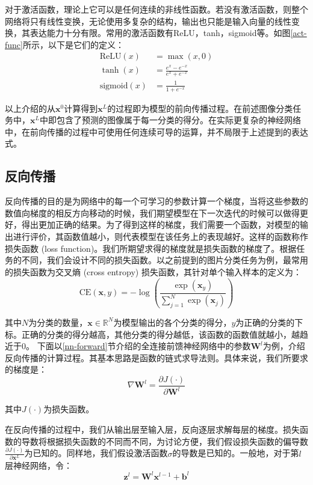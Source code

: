 对于激活函数，理论上它可以是任何连续的非线性函数。若没有激活函数，则整个网络将只有线性变换，无论使用多复杂的结构，输出也只能是输入向量的线性变换，其表达能力十分有限。常用的激活函数有ReLU，tanh，sigmoid等。如图\ref{act-func}所示，以下是它们的定义：
\begin{align}
    \mathrm{ReLU}\left(x\right)&=\max{\left(x,0\right)}\\
    \tanh{\left(x\right)}&=\frac{e^x-e^{-x}}{e^x+e^{-x}}\\
    \mathrm{sigmoid}\left(x\right)&=\frac{1}{1+e^{-x}}
\end{align}

以上介绍的从$\bm{x}^0$计算得到$\bm{x}^L$的过程即为模型的前向传播过程。在前述图像分类任务中，$\bm{x}^L$中即包含了预测的图像属于每一分类的得分。在实际更复杂的神经网络中，在前向传播的过程中可使用任何连续可导的运算，并不局限于上述提到的表达式。

\subsection{反向传播}

反向传播的目的是为网络中的每一个可学习的参数计算一个梯度，当将这些参数的数值向梯度的相反方向移动的时候，我们期望模型在下一次迭代的时候可以做得更好，得出更加正确的结果。为了得到这样的梯度，我们需要一个函数，对模型的输出进行评价，其函数值越小，则代表模型在该任务上的表现越好。这样的函数称作损失函数 (loss function)。我们所期望求得的梯度就是损失函数的梯度了。根据任务的不同，我们会设计不同的损失函数。以之前提到的图片分类任务为例，最常用的损失函数为交叉熵 (cross entropy) 损失函数，其针对单个输入样本的定义为：
\begin{equation}
    \mathrm{CE}\left(\bm{x},y\right)=-\log{\left(\frac{\exp{\left(\bm{x}_y\right)}}{\sum_{j=1}^{N}\exp{\left(\bm{x}_j\right)}}\right)}
\end{equation}

其中$N$为分类的数量，$\bm{x}\in\mathbb{R}^N$为模型输出的各个分类的得分，$y$为正确的分类的下标。正确的分类的得分越高，其他分类的得分越低，该函数的函数值就越小，越趋近于0。
下面以\ref{nn-forward}节介绍的全连接前馈神经网络中的参数$\bm{W}^l$为例，介绍反向传播的计算过程。其基本思路是函数的链式求导法则。具体来说，我们所要求的梯度是：
\begin{equation}
    \nabla\bm{W}^l=\frac{\partial J\left(\cdot\right)}{\partial\bm{W}^l}
\end{equation}

其中$J\left(\cdot\right)$为损失函数。

在反向传播的过程中，我们从输出层至输入层，反向逐层求解每层的梯度。损失函数的导数将根据损失函数的不同而不同，为讨论方便，我们假设损失函数的偏导数$\frac{\partial J\left(\cdot\right)}{\partial\bm{x}^L}$为已知的。同样地，我们假设激活函数$\sigma$的导数是已知的。一般地，对于第$l$层神经网络，令：
\begin{equation}
    \bm{z}^l=\bm{W}^l\bm{x}^{l-1}+\bm{b}^l
\end{equation}

